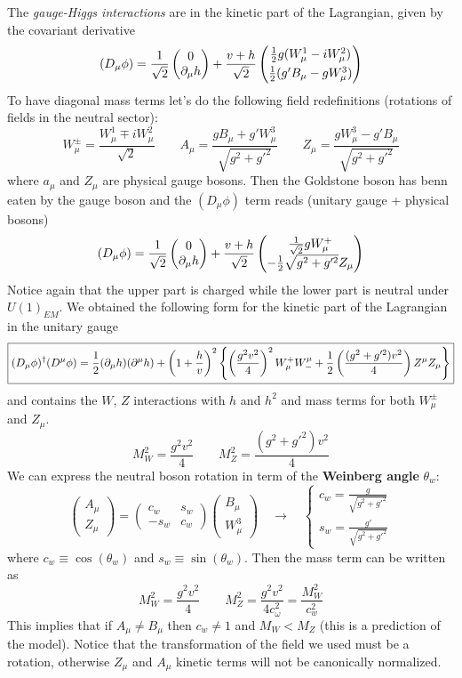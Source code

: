 \documentclass[TheoreticalPhy_ModB.tex]{subfiles}
\begin{document}
The \emph{gauge-Higgs interactions} are in the kinetic part of the Lagrangian, given by the covariant derivative
\[(D_\mu\phi)=\frac1{\sqrt2}\begin{pmatrix}0\\\pde\mu h\end{pmatrix}+\frac{v+h}{\sqrt2}\begin{pmatrix}\frac12g(W_\mu^1-iW_\mu^2)\vspace{0.1cm}\\\frac12(g'B_\mu-gW_\mu^3)\end{pmatrix}\]
To have diagonal mass terms let's do the following field redefinitions (rotations of fields in the neutral sector):
\[W_\mu^\pm=\frac{W_\mu^1\mp iW_\mu^2}{\sqrt2}\qquad
A_\mu=\frac{gB_\mu+g'W_\mu^3}{\sqrt{g^2+g'^2}}\qquad
Z_\mu=\frac{gW_\mu^3-g'B_\mu}{\sqrt{g^2+g'^2}}
\]
where $a_\mu$ and $Z_\mu$ are physical gauge bosons. Then the Goldstone boson has benn eaten by the gauge boson and the $(D_\mu\phi)$ term reads (unitary gauge + physical bosons)
\[(D_\mu\phi)=\frac1{\sqrt2}\begin{pmatrix}0\\\partial_{\mu} h\end{pmatrix}+\frac{v+h}{\sqrt2}\begin{pmatrix}\frac 1{\sqrt2}gW_\mu^+\\-\frac12\sqrt{g^2+g'^2}Z_\mu\end{pmatrix}\]
Notice again that the upper part is charged while the lower part is neutral under $U(1)_{EM}$. We obtained the following form for the kinetic part of the Lagrangian in the unitary gauge
\[\boxed{(D_\mu\phi)^\dagger(D^\mu\phi)=\frac12(\partial_{\mu} h)(\partial^\mu h)+\left(1+\frac hv\right)^2\left\{\left(\frac{g^2v^2}4\right)^2W_\mu^+ W_-^\mu+\frac12\left(\frac{(g^2+g'^2)v^2}4\right)Z^\mu Z_\mu\right\}}\]
and contains the $W$, $Z$ interactions with $h$ and $h^2$ and mass terms for both $W_\mu^\pm$ and $Z_\mu$.
\[M_W^2=\frac{g^2v^2}4\qquad M_Z^2=\frac{(g^2+g'^2)v^2}4\]
We can express the neutral boson rotation in term of the \textbf{Weinberg angle} $\theta_w$:
\[\begin{pmatrix}A_\mu\\ Z_\mu\end{pmatrix}=\begin{pmatrix}c_w&s_w\\-s_w&c_w\end{pmatrix}\begin{pmatrix}B_\mu\\W_\mu^3\end{pmatrix}\quad\to\quad\begin{cases}c_w=\frac g{\sqrt{g^2+g'^2}}\\s_w=\frac{g'}{\sqrt{g^2+g'^2}}\end{cases}\]
where $c_w\equiv\cos(\theta_w)$ and $s_w\equiv\sin(\theta_w)$. Then the mass term can be written as
\[M_W^2=\frac{g^2v^2}4\qquad M_Z^2=\frac{g^2v^2}{4c_\omega^2}=\frac{M_W^2}{c_w^2}\]
This implies that if $A_\mu\neq B_\mu$ then $c_w\neq1$ and $M_W<M_Z$ (this is a prediction of the model). Notice that the transformation of the field we used must be a rotation, otherwise $Z_\mu$ and $A_\mu$ kinetic terms will not be canonically normalized.
\end{document}
